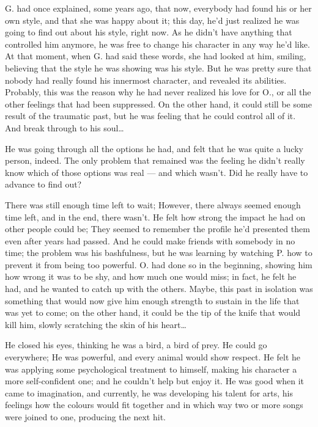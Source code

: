 G. had once explained, some years ago, that now, everybody had found his or her own style, and that she was happy about it; this day, he'd just realized he was going to find out about his style, right now. As he didn't have anything that controlled him anymore, he was free to change his character in any way he'd like. At that moment, when G. had said these words, she had looked at him, smiling, believing that the style he was showing was his style. But he was pretty sure that nobody had really found his innermost character, and revealed its abilities. 
Probably, this was the reason why he had never realized his love for O., or all the other feelings that had been suppressed. On the other hand, it could still be some result of the traumatic past, but he was feeling that he could control all of it. 
And break through to his soul\dots{}

He was going through all the options he had, and felt that he was quite a lucky person, indeed. The only problem that remained was the feeling he didn't really know which of those options was real --- and which wasn't. Did he really have to advance to find out?

There was still enough time left to wait; However, there always seemed enough time left, and in the end, there wasn't. 
He felt how strong the impact he had on other people could be; They seemed to remember the profile he'd presented them even after years had passed. 
And he could make friends with somebody in no time; the problem was his bashfulness, but he was learning by watching P. how to prevent it from being too powerful. O. had done so in the beginning, showing him how wrong it was to be shy, and how much one would miss; in fact, he felt he had, and he wanted to catch up with the others. Maybe, this past in isolation was something that would now give him enough strength to sustain in the life that was yet to come; on the other hand, it could be the tip of the knife that would kill him, slowly scratching the skin of his heart\dots{}

He closed his eyes, thinking he was a bird, a bird of prey. He could go everywhere; He was powerful, and every animal would show respect. He felt he was applying some psychological treatment to himself, making his character a more self-confident one; and he couldn't help but enjoy it. He was good when it came to imagination, and currently, he was developing his talent for arts, his feelings how the colours would fit together and in which way two or more songs were joined to one, producing the next hit.

